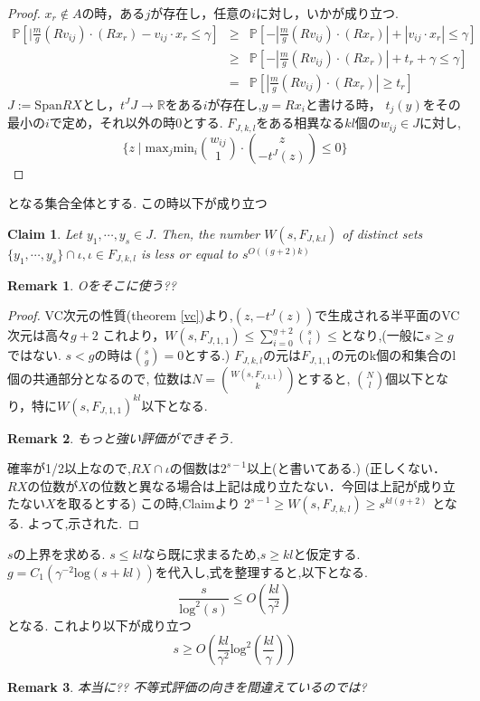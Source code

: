 \documentclass{ujarticle}
\newtheorem*{rem}{Remark}
\newtheorem{clm}{Claim}
\begin{document}
\begin{proof}
$x_r \notin A$の時，ある$j$が存在し，任意の$i$に対し，いかが成り立つ.
\begin{eqnarray*}
  \mathbb{P} [ | \frac{m}{g}(Rv_{ij})\cdot (Rx_r) - v_{ij} \cdot  x_r \le  \gamma ]
  & \ge  & \mathbb{P} [ - | \frac{m}{g}(Rv_{ij})\cdot (Rx_r)| + |v_{ij} \cdot  x_r| \le  \gamma ] \\
  & \ge & \mathbb{P} [ - | \frac{m}{g}(Rv_{ij})\cdot (Rx_r)| +  t_r +  \gamma  \le  \gamma ] \\
  & =&  \mathbb{P} [ | \frac{m}{g}(Rv_{ij})\cdot (Rx_r)| \ge  t_r  ]
\end{eqnarray*}
$J:=\mathrm{Span}RX$とし，$t^J J \to \mathbb{R}$をある$i$が存在し,$y=Rx_i$と書ける時，
$t_j(y)$をその最小の$i$で定め，それ以外の時$0$とする.
$F_{J,k,l}$をある相異なる$kl$個の$w_{ij} \in J$に対し,
\begin{equation*}
 \{ z \mid \mathrm{max}_j \mathrm{min}_i \binom{w_{ij}}{1}\cdot \binom{z}{-t^J(z)} \le 0 \}
\end{equation*}
\end{proof}
となる集合全体とする.
この時以下が成り立つ
\begin{clm}
  Let $y_1, \cdots ,y_s \in J$. Then, the number $W(s,F_{J,k.l})$ of distinct sets
  $\{ y_1, \cdots , y_s\} \cap \iota , \iota \in F_{J,k,l}$ is less or equal to $s^{O((g+2)k)}$
\end{clm}
\begin{rem}
 Oをそこに使う??
\end{rem}
\begin{proof}
 VC次元の性質(theorem \ref{vc})より,$(z,-t^J(z))$で生成される半平面のVC次元は高々$g+2$
 これより，$W(s,F_{J,1,1})  \le \sum_{i=0}^{g+2}\binom{s}{i} \le $となり,(一般に$s \ge g$ではない.
 $s < g$の時は$\binom{s}{g}=0$とする.)
 $F_{J,k,l}$の元は$F_{J,1,1}$の元のk個の和集合のl個の共通部分となるので,
 位数は$N =\binom{W(s,F_{J,1,1})}{k}$とすると,
 $\binom{N}{l}$個以下となり，特に$W(s,F_{J,1,1})^{kl}$以下となる.

\begin{rem}
 もっと強い評価ができそう.
\end{rem}

確率が1/2以上なので,$RX \cap \iota$の個数は$2^{s-1}$以上(と書いてある.)
(正しくない．$RX$の位数が$X$の位数と異なる場合は上記は成り立たない．今回は上記が成り立たない$X$を取るとする)
この時,Claimより
$2^{s-1} \ge W(s,F_{J,k,l}) \ge  s^{kl(g+2)}$
となる.
よって,示された.
\end{proof}

$s$の上界を求める.
$s \le kl$なら既に求まるため,$s \ge kl$と仮定する.
$g = C_1(\gamma^{-2}\mathrm{log}(s+kl) )$を代入し,式を整理すると,以下となる.
\begin{equation*}
 \frac{s}{\mathrm{log}^2(s) } \le O (\frac{kl}{\gamma^2 })
\end{equation*}
となる.
これより以下が成り立つ
\begin{equation*}
s \ge O(\frac{kl}{\gamma^2}\mathrm{log}^2(\frac{kl}{\gamma}))
\end{equation*}
\begin{rem}
 本当に?? 不等式評価の向きを間違えているのでは?
\end{rem}
\end{document}
